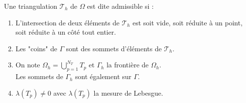\documentclass[12pt,a4paper]{article}
\newcommand{\definition}[2]{%
    \begin{tcolorbox}[colback=white,colframe=blue!25!white,title=\textbf{Définition #1}, coltitle=black]
        #2
    \end{tcolorbox}
}
\begin{document}
\definition{- Triangulation admissible}{
    Une triangulation $\mathcal{T}_h$ de $\Omega$ est dite admissible si :
    \begin{enumerate}[label=\roman*)]
        \item L'intersection de deux éléments de $\mathcal{T}_h$ est soit vide, soit réduite à un point, soit réduite à un côté tout entier.
        \item Les "coins" de $\Gamma$ sont des sommets d'éléments de $\mathcal{T}_h$.
        \item On note $\Omega_h = \bigcup_{p=1}^{N_T} T_p$ et $\Gamma_h$ la frontière de $\Omega_h$. \\
        Les sommets de $\Gamma_h$ sont également sur $\Gamma$.
        \item $\lambda(T_p) \neq 0$ avec $\lambda(T_p)$ la mesure de Lebesgue.
    \end{enumerate}
}
\end{document}
